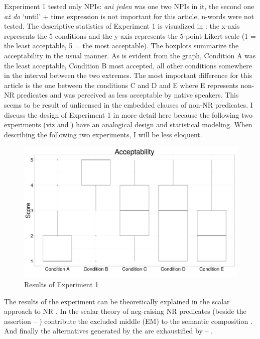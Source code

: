 \documentclass[output=paper, colorlinks, citecolor=brown, newtxmath]{langsci/langscibook}
\begin{document}
\noindent Experiment 1 tested only NPIs: \textit{ani jeden} was one two NPIs in it, the second one \textit{až do} `until' + time expression is not important for this article, n-words were not tested. The descriptive statistics of Experiment 1 is visualized in : the x-axis represents the 5 conditions and the y-axis represents the 5-point Likert scale (1 = the least acceptable, 5 = the most acceptable). The boxplots summarize the acceptability in the usual manner. As is evident from the graph, Condition A was the least acceptable, Condition B most accepted, all other conditions somewhere in the interval between the two extremes. The most important difference for this article is the one between the conditions C and D and E where E represents non-NR predicates and was perceived as less acceptable by native speakers. This seems to be result of unlicensed  in the embedded clauses of non-NR predicates. I discuss the design of Experiment 1 in more detail here because the following two experiments (viz  and ) have an analogical design and statistical modeling. When describing the following two experiments, I will be less eloquent.

\begin{figure}
\centering
\includegraphics[scale=0.22]{figures/boxplot-exp1.png}
\caption{Results of Experiment 1}
\label{fig1_stat}
\end{figure}


The results of the experiment can be theoretically explained in the scalar approach to NR \citep{horn1973semantic,romoli2012soft,romoli2013scalar}. In the scalar theory of neg-raising  NR predicates (beside the assertion -- ) contribute the  excluded middle (EM)  to the semantic composition . And finally the   alternatives generated by the  are exhaustified by  -- .
\end{document}
